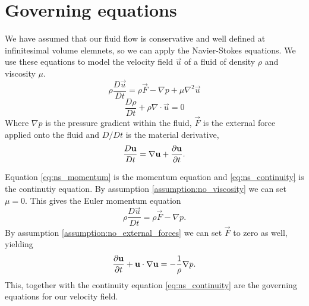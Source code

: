 \section{Governing equations}\label{ss:governing_eqs}
We have assumed that our fluid flow is conservative and well defined at infinitesimal volume elemnets, so we can apply the Navier-Stokes equations. We use these equations to model the velocity field $\vec{u}$ of a fluid of density $\rho$ and viscosity $\mu$.
%
%
\begin{equation}\label{eq:ns_momentum}
    \rho \frac{D \vec{u}}{D t} = \rho \vec{F} - \nabla p + \mu \nabla^2 \vec{u}
\end{equation}
\begin{equation}\label{eq:ns_continuity}
    \frac{D \rho}{D t} + \rho \nabla \cdot \vec{u} = 0
\end{equation}
Where $\nabla p$ is the pressure gradient within the fluid, $\vec{F}$ is the external force applied onto the fluid and $D/Dt$ is the material derivative,
  \[ \frac{D\mathbf{u}}{Dt} = \nabla \mathbf{u} + \frac{\partial \mathbf{u}}{\partial t}.\] \par
%
Equation \eqref{eq:ns_momentum} is the momentum equation and \eqref{eq:ns_continuity} is the continutiy equation. By assumption \ref{assumption:no_viscosity} we can set $\mu = 0$. This gives the Euler momentum equation \parencite{shaughnessy05fluids}
\begin{equation}
    \rho \frac{D \vec{u}}{D t} = \rho \vec{F} - \nabla p.
\end{equation}
%
By assumption \ref{assumption:no_external_forces} we can set $\vec{F}$ to zero as well, yielding
    \begin{equation}\label{eq:euler_momentum}
        \frac{\partial \mathbf{u}}{\partial t} + \mathbf{u} \cdot \nabla\mathbf{u} = - \frac{1}{\rho}\nabla p.
    \end{equation}
%
This, together with the continuity equation \eqref{eq:ns_continuity} are the governing equations for our velocity field.
%
